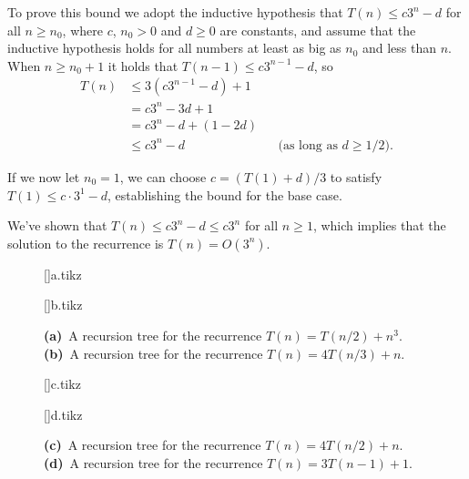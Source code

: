 To prove this bound we adopt the inductive hypothesis that $T(n)\le c3^n-d$ for all $n\ge n_0$, where $c$, $n_0>0$ and $d\ge0$ are constants, and assume that the inductive hypothesis holds for all numbers at least as big as $n_0$ and less than $n$.
When $n\ge n_0+1$ it holds that $T(n-1)\le c3^{n-1}-d$, so
\begin{align*}
    T(n) &\le 3(c3^{n-1}-d)+1 \\
    &= c3^n-3d+1 \\
    &= c3^n-d+(1-2d) \\
    &\le c3^n-d && \text{(as long as $d\ge1/2$)}.
\end{align*}

If we now let $n_0=1$, we can choose $c=(T(1)+d)/3$ to satisfy $T(1)\le c\cdot3^1-d$, establishing the bound for the base case.

We've shown that $T(n)\le c3^n-d\le c3^n$ for all $n\ge1$, which implies that the solution to the recurrence is $T(n)=O(3^n)$.

\begin{figure}[!htb]
    \subcaptionbox{\label{fig:4.4-1a}}[\textwidth]{{a.tikz}}
    \par\vspace{10mm}
    \subcaptionbox{\label{fig:4.4-1b}}[\textwidth]{{b.tikz}}
    \caption{
        \textbf{(a)}\, A recursion tree for the recurrence $T(n)=T(n/2)+n^3$.\,
        \textbf{(b)}\, A recursion tree for the recurrence $T(n)=4T(n/3)+n$.
    } \label{fig:4.4-1}
\end{figure}

\begin{figure}[htb!]\ContinuedFloat
    \subcaptionbox{\label{fig:4.4-1c}}[\textwidth]{{c.tikz}}
    \par\vspace{10mm}
    \subcaptionbox{\label{fig:4.4-1d}}[\textwidth]{{d.tikz}}
    \caption{
        \textbf{(c)}\, A recursion tree for the recurrence $T(n)=4T(n/2)+n$.\,
        \textbf{(d)}\, A recursion tree for the recurrence $T(n)=3T(n-1)+1$.
    }
\end{figure}
